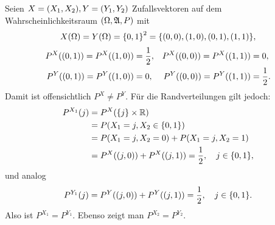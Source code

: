 \documentclass{lecture}
\begin{document}
    \begin{example}
        Seien \(X = \parentheses*{X_1, X_2}, Y = \parentheses*{Y_1, Y_2}\) Zufallsvektoren auf dem Wahrscheinlichkeitsraum \(\parentheses*{\Omega, \mathfrak{A}, P}\) mit
        \[
            X\parentheses*{\Omega} = Y\parentheses*{\Omega} = \braces*{0, 1}^2 = \braces*{\parentheses*{0, 0}, \parentheses*{1, 0}, \parentheses*{0, 1}, \parentheses*{1, 1}},
        \]
        \begin{align*}
            P^X\parentheses*{\parentheses*{0, 1}} = P^X\parentheses*{\parentheses*{1, 0}} &= \frac{1}{2}, & P^X\parentheses*{\parentheses*{0, 0}} = P^X\parentheses*{\parentheses*{1, 1}} &= 0,\\
            P^Y\parentheses*{\parentheses*{0, 1}} = P^Y\parentheses*{\parentheses*{1, 0}} &= 0, & P^Y\parentheses*{\parentheses*{0, 0}} = P^Y\parentheses*{\parentheses*{1, 1}} &= \frac{1}{2}.
        \end{align*}
        Damit ist offensichtlich \(P^X \ne P^Y\).
        Für die Randverteilungen gilt jedoch:
        \begin{align*}
            P^{X_1}\parentheses*{j} &= P^X\parentheses*{\braces*{j} \times \R}\\
            &= P\parentheses*{X_1 = j, X_2 \in \braces*{0, 1}}\\
            &= P\parentheses*{X_1 = j, X_2 = 0} + P\parentheses*{X_1 = j, X_2 = 1}\\
            &= P^X\parentheses*{\parentheses*{j, 0}} + P^X\parentheses*{\parentheses*{j, 1}} = \frac{1}{2}, \quad j \in \braces*{0, 1},
        \end{align*}
        und analog
        \[
            P^{Y_1}\parentheses*{j} = P^Y\parentheses*{\parentheses*{j, 0}} + P^Y\parentheses*{\parentheses*{j, 1}} = \frac{1}{2}, \quad j \in \braces*{0, 1}.
        \]
        Also ist \(P^{X_1} = P^{Y_1}\).
        Ebenso zeigt man \(P^{X_2} = P^{Y_2}\).
    \end{example}
\end{document}
